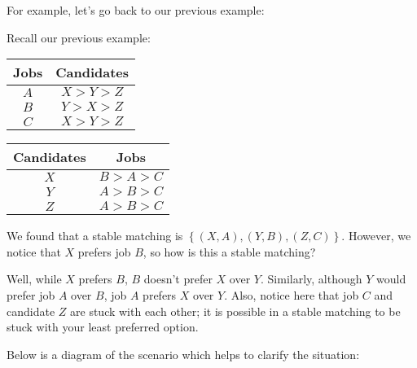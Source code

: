 \documentclass[openany]{book}
\begin{document}
For example, let's go back to our previous example:
\begin{example}
	Recall our previous example:
	
	\begin{center}
		\begin{tabular}{|c|c|}
			\hline
			Jobs & Candidates \\
			\hline
			$A$ & $X > Y >Z$ \\
			\hline
			$B$ & $Y > X > Z$ \\
			\hline
			$C$ & $X > Y > Z$ \\
			\hline
		\end{tabular}
		
		\bigskip
		
		\begin{tabular}{|c|c|}
			\hline
			Candidates & Jobs \\
			\hline
			$X$ & $B > A > C$ \\
			\hline
			$Y$ & $A > B > C$ \\
			\hline
			$Z$ & $A > B > C$ \\
			\hline
		\end{tabular}
	\end{center}

	We found that a stable matching is $\left\{  (X, A), (Y, B), (Z, C)\right\}$. However, we notice that $X$ prefers job $B$, so how is this a stable matching? 
	
	Well, while $X$ prefers $B$, $B$ doesn't prefer $X$ over $Y$. Similarly, although $Y$ would prefer job $A$ over $B$, job $A$ prefers $X$ over $Y$. Also, notice here that job $C$ and candidate $Z$ are stuck with each other; it is possible in a stable matching to be stuck with your least preferred option.
	
	Below is a diagram of the scenario which helps to clarify the situation:
	
	\begin{center}
	\end{center}
\end{example}
\end{document}
